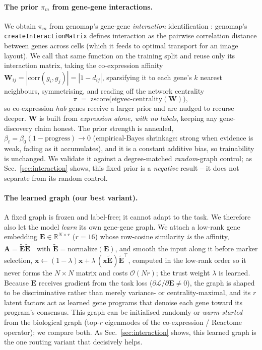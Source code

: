 \documentclass[letterpaper]{article}
\begin{document}
\paragraph{The prior $\pi_m$ from gene-gene interactions.}
We obtain $\pi_m$ from genomap's gene-gene \emph{interaction} identification
\cite{islam2023cartography}: genomap's \texttt{createInteractionMatrix} defines
interaction as the pairwise correlation distance between genes across cells (which it
feeds to optimal transport for an image layout). We call that same function on the
training split and reuse only its interaction matrix, taking the co-expression
affinity $\mathbf{W}_{ij}=|\mathrm{corr}(g_i,g_j)|=|1-d_{ij}|$, sparsifying it to each
gene's $k$ nearest neighbours, symmetrising, and reading off the network centrality
\begin{equation}
\pi \;=\; \mathrm{zscore}\big(\text{eigvec-centrality}(\mathbf{W})\big),
\end{equation}
so co-expression \emph{hub} genes receive a larger prior and are nudged to recurse deeper.
$\mathbf{W}$ is built from \emph{expression alone, with no labels}, keeping any
gene-discovery claim honest. The prior strength is annealed, $\beta_t=\beta_0(1-\text{progress})\!\to\!0$
(empirical-Bayes shrinkage: strong when evidence is weak, fading as it accumulates), and it
is a constant additive bias, so trainability is unchanged. We validate it against a
degree-matched \emph{random}-graph control; as Sec.~\ref{sec:interaction} shows, this fixed
prior is a \emph{negative} result -- it does not separate from its random control.

\paragraph{The learned graph (our best variant).}
A fixed graph is frozen and label-free; it cannot adapt to the task. We therefore also
let the model \emph{learn} its own gene-gene graph. We attach a low-rank gene embedding
$\mathbf{E}\in\mathbb{R}^{N\times r}$ ($r{=}16$) whose row-cosine similarity
\emph{is} the affinity, $\mathbf{A}=\tilde{\mathbf{E}}\tilde{\mathbf{E}}^{\top}$ with
$\tilde{\mathbf{E}}=\mathrm{normalize}(\mathbf{E})$, and smooth the input along it before
marker selection, $\mathbf{x}\leftarrow(1-\lambda)\mathbf{x}+\lambda\,(\mathbf{x}
\tilde{\mathbf{E}})\tilde{\mathbf{E}}^{\top}$, computed in the low-rank order so it never
forms the $N\times N$ matrix and costs $\mathcal{O}(Nr)$; the trust weight $\lambda$ is
learned. Because $\mathbf{E}$ receives gradient from the task loss
($\partial\mathcal{L}/\partial\mathbf{E}\neq 0$), the graph is shaped to be
discriminative rather than merely variance- or centrality-maximal, and its $r$ latent
factors act as learned gene programs that denoise each gene toward its program's
consensus. This graph can be initialised randomly or \emph{warm-started} from the
biological graph (top-$r$ eigenmodes of the co-expression / Reactome operator); we
compare both. As Sec.~\ref{sec:interaction} shows, this learned graph is the one routing
variant that decisively helps.
\end{document}
